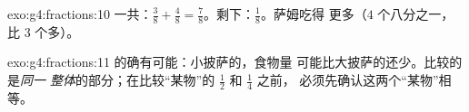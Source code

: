 \begin{solution}{exo:g4:fractions:10}
一共：$\frac38 + \frac48 = \frac78$。剩下：$\frac18$。萨姆吃得
更多（$4$ 个八分之一，比 $3$ 个多）。
\end{solution}

\begin{solution}{exo:g4:fractions:11}
的确有可能：小披萨的，食物量
可能比大披萨的还少。比较的是\emph{同一
整体}的部分；在比较“某物”的 $\frac12$ 和 $\frac14$ 之前，
必须先确认这两个“某物”相等。
\end{solution}
